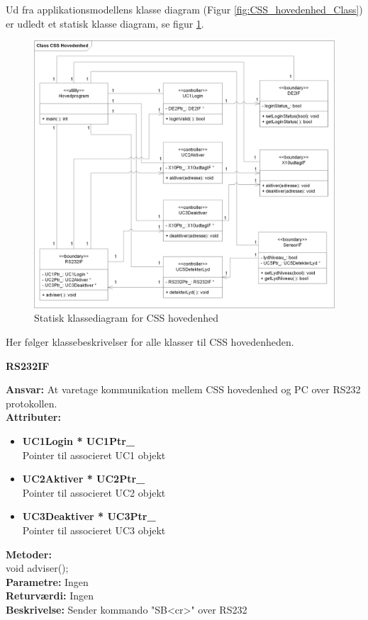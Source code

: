 Ud fra applikationsmodellens klasse diagram (Figur \ref{fig:CSS_hovedenhed_Class}) er udledt et statisk klasse diagram, se figur \ref{fig:CSS_hovedenhed_Class_Static}.
\begin{figure}[!htb] \centering
     \includegraphics[width=\textwidth]{billeder/uml/CSS_hovedenhed_Class_Static}
     \caption{Statisk klassediagram for CSS hovedenhed}
     \label{fig:CSS_hovedenhed_Class_Static}
\end{figure}

Her følger klassebeskrivelser for alle klasser til CSS hovedenheden. \\

%
%
{\centering
\textbf{RS232IF}\par
}
\textbf{Ansvar:} At varetage kommunikation mellem CSS hovedenhed og PC over RS232 protokollen. \\
\textbf{Attributer:}
\begin{itemize}
	\item \textbf{UC1Login * UC1Ptr\_} \\
	Pointer til associeret UC1 objekt
	\item \textbf{UC2Aktiver * UC2Ptr\_} \\
	Pointer til associeret UC2 objekt
	\item \textbf{UC3Deaktiver * UC3Ptr\_} \\
	Pointer til associeret UC3 objekt
\end{itemize}
\textbf{Metoder:} \\
void adviser(); \\
\textbf{Parametre:} Ingen \\
\textbf{Returværdi:} Ingen \\
\textbf{Beskrivelse:} Sender kommando "SB<cr>" over RS232 \\

